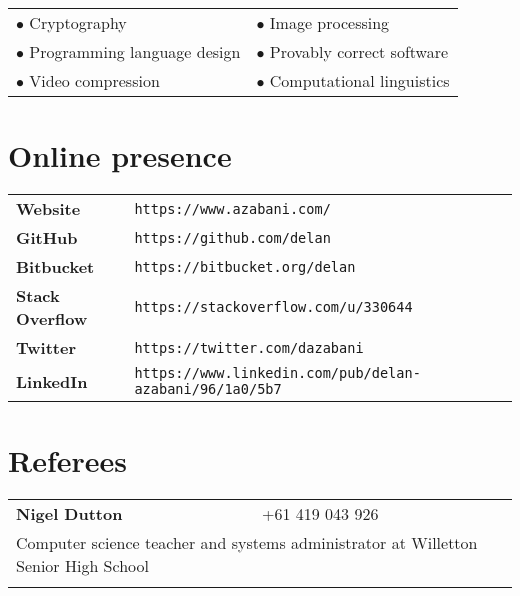 \documentclass[a4paper,12pt]{article}
\begin{document}
\begin{tabular}{p{8cm}p{8cm}}
	$\bullet$ Cryptography &
	$\bullet$ Image processing \\
	$\bullet$ Programming language design &
	$\bullet$ Provably correct software \\
	$\bullet$ Video compression &
	$\bullet$ Computational linguistics
\end{tabular}

\section*{Online presence}

\begin{tabular}{p{3.5cm}p{12.5cm}}
	\textbf{Website} &
		\texttt{https://www.azabani.com/}\\
	\textbf{GitHub} &
		\texttt{https://github.com/delan}\\
	\textbf{Bitbucket} &
		\texttt{https://bitbucket.org/delan}\\
	\textbf{Stack Overflow} &
		\texttt{https://stackoverflow.com/u/330644}\\
	\textbf{Twitter} &
		\texttt{https://twitter.com/dazabani}\\
	\textbf{LinkedIn} &
		\texttt{https://www.linkedin.com/pub/delan-azabani/96/1a0/5b7}
\end{tabular}

\section*{Referees}

\begin{tabular}{p{3.5cm}p{12.5cm}}
	\textbf{Nigel Dutton} &
		+61 419 043 926\\
	\multicolumn{2}{p{17cm}}{
		Computer science teacher and systems administrator
		at Willetton Senior High School
	}\\\\
\end{tabular}
\end{document}
